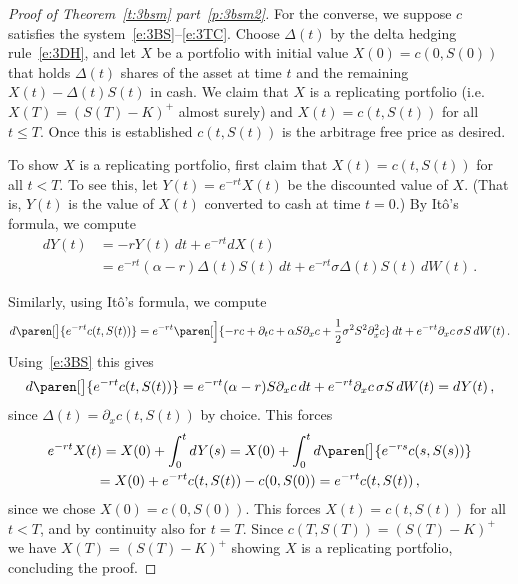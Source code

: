 \begin{proof}[Proof of Theorem~\ref{t:3bsm} part~\ref{p:3bsm2}]
  For the converse, we suppose $c$ satisfies the system~\eqref{e:3BS}--\eqref{e:3TC}.
  Choose $\Delta(t)$ by the delta hedging rule~\eqref{e:3DH}, and let $X$ be a portfolio with initial value $X(0) = c(0, S(0))$ that holds $\Delta(t)$ shares of the asset at time $t$ and the remaining $X(t) - \Delta(t) S(t)$ in cash.
  We claim that $X$ is a replicating portfolio (i.e.\ $X(T) = (S(T) - K)^+$ almost surely) and $X(t) = c(t, S(t))$ for all $t \leq T$.
  Once this is established $c(t, S(t))$ is the arbitrage free price as desired.

  To show $X$ is a replicating portfolio, first claim that $X(t) = c(t, S(t))$ for all $t < T$.
  To see this, let $Y(t) = e^{-r t} X(t)$ be the discounted value of $X$.
  (That is, $Y(t)$ is the value of $X(t)$ converted to cash at time $t = 0$.)
  By It\^o's formula, we compute
  \begin{align*}
    dY(t) &= -r Y(t) \, dt + e^{-rt} dX(t)
    \\
      &= e^{-rt} (\alpha - r) \Delta(t) S(t) \, dt
	  + e^{-rt} \sigma \Delta(t) S(t) \, dW(t)\,.
  \end{align*}

  Similarly, using It\^o's formula, we compute
  \begin{equation*}
    d \paren[\big]{ e^{-rt} c(t, S(t)) }
      = e^{-rt} \paren[\Big]{-r c + \partial_t c + \alpha S \partial_x c + \frac{1}{2} \sigma^2 S^2 \partial_x^2 c} \, dt
	+ e^{-rt} \partial_x c\, \sigma S \, dW(t)\,.
  \end{equation*}
  Using~\eqref{e:3BS} this gives
  \begin{equation*}
    d \paren[\big]{ e^{-rt} c(t, S(t)) }
      = e^{-rt} (\alpha - r) S \partial_x c \, dt
	+ e^{-rt} \partial_x c\, \sigma S \, dW(t)
      = dY(t)\,,
  \end{equation*}
  since $\Delta(t) = \partial_x c(t, S(t))$ by choice.
  This forces
  \begin{multline*}
    e^{-rt} X(t)
      = X(0) + \int_0^t dY(s)
      = X(0) + \int_0^t d\paren[\big]{ e^{-rs} c(s, S(s)) }
    \\
      = X(0) + e^{-rt}c(t, S(t)) - c(0, S(0))
      = e^{-rt}c(t, S(t))\,,
  \end{multline*}
  since we chose $X(0) = c(0, S(0))$.
  This forces $X(t) = c(t, S(t))$ for all $t < T$, and by continuity also for $t = T$.
  Since $c(T, S(T)) = (S(T) - K)^+$ we have $X(T) = (S(T) - K)^+$ showing $X$ is a replicating portfolio, concluding the proof.
\end{proof}
